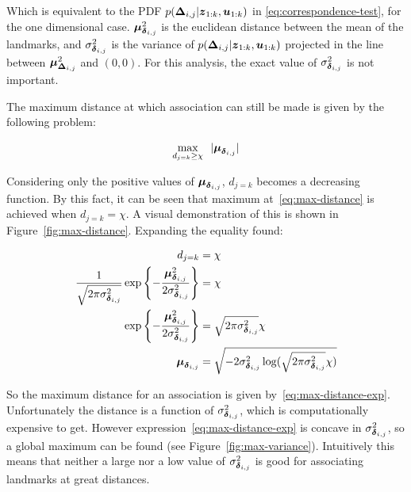 Which is equivalent to the PDF $p(\boldsymbol{\Delta}_{i,j}|\boldsymbol{z}_{1:k},\boldsymbol{u}_{1:k})$ in \eqref{eq:correspondence-test}, for the one dimensional case. $\boldsymbol{\mu}_{\boldsymbol{\delta}_{i,j}}^2$ is the euclidean distance between the mean of the landmarks, and $\sigma_{\boldsymbol{\delta}_{i,j}}^2$ is the variance of $p(\boldsymbol{\Delta}_{i,j}|\boldsymbol{z}_{1:k},\boldsymbol{u}_{1:k})$ projected in the line between $\boldsymbol{\mu}_{\boldsymbol{\Delta}_{i,j}}^2$ and $(0,0)$. For this analysis, the exact value of $\sigma_{\boldsymbol{\delta}_{i,j}}^2$ is not important.

The maximum distance at which association can still be made is given by the following problem:

\begin{equation}
\underset{d_{j=k}\geq\chi}{\text{max}}~~  |\boldsymbol{\mu}_{\boldsymbol{\delta}_{i,j}}|
\label{eq:max-distance}
\end{equation}

Considering only the positive values of $\boldsymbol{\mu}_{\boldsymbol{\delta}_{i,j}}$, $d_{j=k}$ becomes a decreasing function. By this fact, it can be seen that maximum at~\eqref{eq:max-distance} is achieved when $d_{j=k}=\chi$. A visual demonstration of this is shown in Figure~\ref{fig:max-distance}. Expanding the equality found:

\begin{align}
d_{j=k} &= \chi\\
\frac{1}{\sqrt{2\pi\sigma_{\boldsymbol{\delta}_{i,j}}^2}}
\exp\left\lbrace -\frac{\boldsymbol{\mu}_{\boldsymbol{\delta}_{i,j}}^2}{2\sigma_{\boldsymbol{\delta}_{i,j}}^2}\right\rbrace &= \chi \\
\exp\left\lbrace -\frac{\boldsymbol{\mu}_{\boldsymbol{\delta}_{i,j}}^2}{2\sigma_{\boldsymbol{\delta}_{i,j}}^2}\right\rbrace&= \sqrt{2\pi\sigma_{\boldsymbol{\delta}_{i,j}}^2} \chi\\
\boldsymbol{\mu}_{\boldsymbol{\delta}_{i,j}} &= \sqrt{-2\sigma_{\boldsymbol{\delta}_{i,j}}^2\log(\sqrt{2\pi\sigma_{\boldsymbol{\delta}_{i,j}}^2} \chi)} \label{eq:max-distance-exp}
\end{align}

So the maximum distance for an association is given by~\eqref{eq:max-distance-exp}. Unfortunately the distance is a function of $\sigma_{\boldsymbol{\delta}_{i,j}}^2$, which is computationally expensive to get. However expression~\eqref{eq:max-distance-exp} is concave in $\sigma_{\boldsymbol{\delta}_{i,j}}^2$, so a global maximum can be found (see Figure~\ref{fig:max-variance}). Intuitively this means that neither a large nor a low value of $\sigma_{\boldsymbol{\delta}_{i,j}}^2$ is good for associating landmarks at great distances. 

